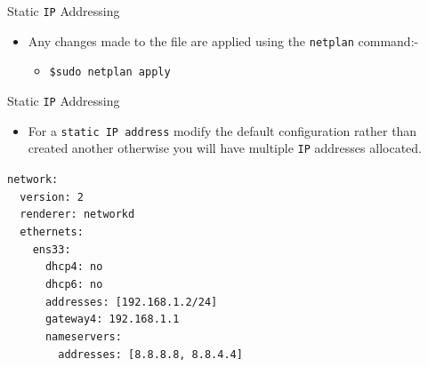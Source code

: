 \documentclass[aspectratio=169]{beamer}
\begin{document}
\begin{frame}{Static \texttt{IP} Addressing}
  \begin{itemize}
    \item Any changes made to the file are applied using the \texttt{netplan} command:-
    \begin{itemize}
      \item \texttt{\$sudo netplan apply}
    \end{itemize}
  \end{itemize}
\end{frame}

\begin{frame}{Static \texttt{IP} Addressing}
  \begin{itemize}
    \item For a \texttt{static IP address} modify the default configuration rather than created another otherwise you will have multiple \texttt{IP} addresses allocated.
  \end{itemize}
  \begin{center}
    \begin{minipage}{10cm}
      \begin{block}{}
        \texttt{network:\\
        ~~version: 2\\
        ~~renderer: networkd\\
        ~~ethernets:\\
        ~~~~ens33:\\
        ~~~~~~dhcp4: no\\
        ~~~~~~dhcp6: no\\
        ~~~~~~addresses: [192.168.1.2/24]\\
        ~~~~~~gateway4: 192.168.1.1\\
        ~~~~~~nameservers:\\
        ~~~~~~~~addresses: [8.8.8.8, 8.8.4.4]}
      \end{block}
    \end{minipage}
  \end{center}
\end{frame}
\end{document}
